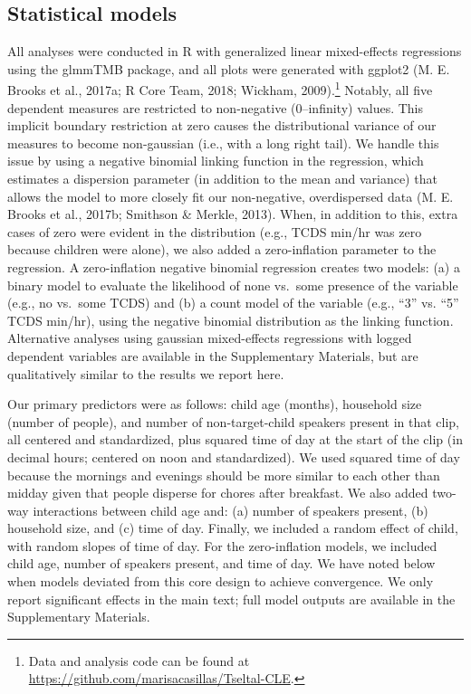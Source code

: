 \documentclass[floatsintext,man]{apa6}
\theoremstyle{definition}
\theoremstyle{definition}
\theoremstyle{definition}
\theoremstyle{remark}
\begin{document}
\subsection{Statistical models}\label{statistical-models}

All analyses were conducted in R with generalized linear mixed-effects
regressions using the glmmTMB package, and all plots were generated with
ggplot2 (M. E. Brooks et al., 2017a; R Core Team, 2018; Wickham,
2009).\footnote{Data and analysis code can be found at
  \url{https://github.com/marisacasillas/Tseltal-CLE}.} Notably, all
five dependent measures are restricted to non-negative (0--infinity)
values. This implicit boundary restriction at zero causes the
distributional variance of our measures to become non-gaussian (i.e.,
with a long right tail). We handle this issue by using a negative
binomial linking function in the regression, which estimates a
dispersion parameter (in addition to the mean and variance) that allows
the model to more closely fit our non-negative, overdispersed data (M.
E. Brooks et al., 2017b; Smithson \& Merkle, 2013). When, in addition to
this, extra cases of zero were evident in the distribution (e.g., TCDS
min/hr was zero because children were alone), we also added a
zero-inflation parameter to the regression. A zero-inflation negative
binomial regression creates two models: (a) a binary model to evaluate
the likelihood of none vs.~some presence of the variable (e.g., no
vs.~some TCDS) and (b) a count model of the variable (e.g., \enquote{3}
vs. \enquote{5} TCDS min/hr), using the negative binomial distribution
as the linking function. Alternative analyses using gaussian
mixed-effects regressions with logged dependent variables are available
in the Supplementary Materials, but are qualitatively similar to the
results we report here.

Our primary predictors were as follows: child age (months), household
size (number of people), and number of non-target-child speakers present
in that clip, all centered and standardized, plus squared time of day at
the start of the clip (in decimal hours; centered on noon and
standardized). We used squared time of day because the mornings and
evenings should be more similar to each other than midday given that
people disperse for chores after breakfast. We also added two-way
interactions between child age and: (a) number of speakers present, (b)
household size, and (c) time of day. Finally, we included a random
effect of child, with random slopes of time of day. For the
zero-inflation models, we included child age, number of speakers
present, and time of day. We have noted below when models deviated from
this core design to achieve convergence. We only report significant
effects in the main text; full model outputs are available in the
Supplementary Materials.
\end{document}
